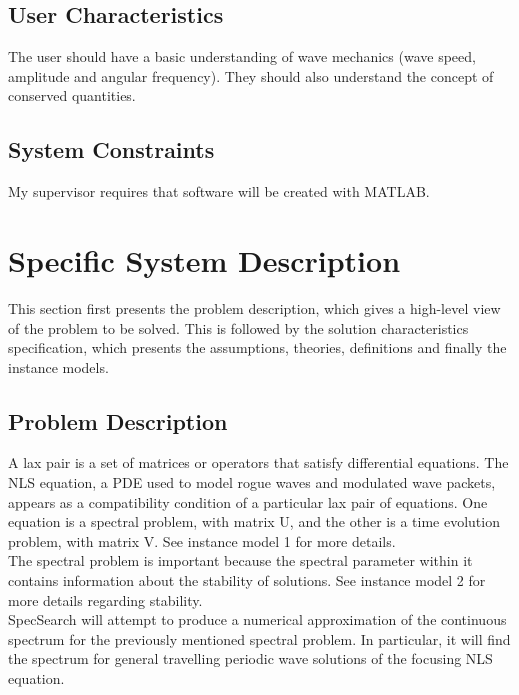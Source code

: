 \documentclass[12pt]{article}
\begin{document}
\subsection{User Characteristics} \label{SecUserCharacteristics}

The user should have a basic understanding of wave mechanics (wave 
speed, 
amplitude and angular frequency). They should also understand the concept of 
conserved quantities. 

\subsection{System Constraints}

My supervisor requires that software will be created with MATLAB.


\section{Specific System Description}

This section first presents the problem description, which gives a high-level
view of the problem to be solved.  This is followed by the solution 
characteristics specification, which presents the assumptions, theories, 
definitions and finally the instance models. 

\subsection{Problem Description} \label{Sec_pd}
A lax pair is a set of matrices or operators that satisfy differential 
equations. The NLS equation, a PDE used to model rogue waves and modulated wave 
packets, appears as a compatibility condition of a particular lax pair of 
equations. One equation is a spectral problem, with matrix U, and the other is 
a time evolution problem, with matrix V. See instance model 1  for more 
details.\\

 The 
spectral problem is important because the spectral 
parameter within it contains information about the stability of solutions. See 
instance model 2 for more details regarding stability.\\

SpecSearch will attempt to produce a numerical approximation of the continuous 
spectrum for the previously mentioned spectral problem. In particular, 
it will find the spectrum for general travelling periodic wave solutions of the 
focusing
NLS equation. \\ 
\end{document}
